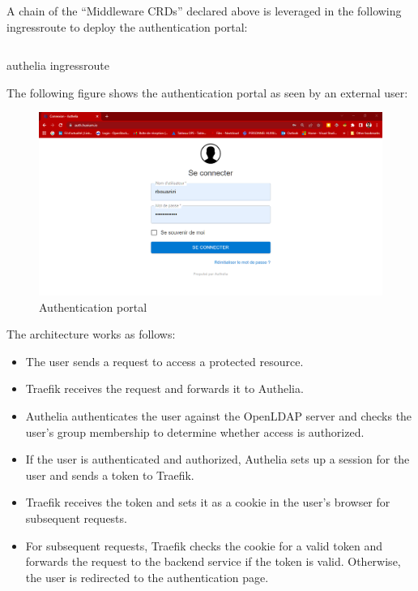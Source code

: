 A chain of the “Middleware CRDs” declared above is leveraged in the following  ingressroute to deploy the authentication portal: 

\begin{listing}[H]
\inputminted{Yaml}{codeListing/authelia_ingressroute.yml}
\caption{authelia ingressroute}
\label{lst:authelia ingressroute}
\end{listing}

The following figure shows the authentication portal as seen by an external user: 
\begin{figure}[H]\centering
\includegraphics[width=1.0\textwidth,angle=00]{assets/f55.png}
\caption{Authentication portal}
\label{fig:f55}
\end{figure}


The architecture works as follows: 
\begin{itemize}[label={--}]
\item The user sends a request to access a protected resource. 
\item  Traefik receives the request and forwards it to Authelia. 
\item  Authelia authenticates the user against the OpenLDAP server and checks the user's group membership to determine whether access is authorized. 
\item  If the user is authenticated and authorized, Authelia sets up a session for the user and sends a token to Traefik. 
\item  Traefik receives the token and sets it as a cookie in the user's browser for subsequent requests. 
\item  For subsequent requests, Traefik checks the cookie for a valid token and forwards the request to the backend service if the token is valid. Otherwise, the user is redirected to the authentication page.  
\end{itemize}

